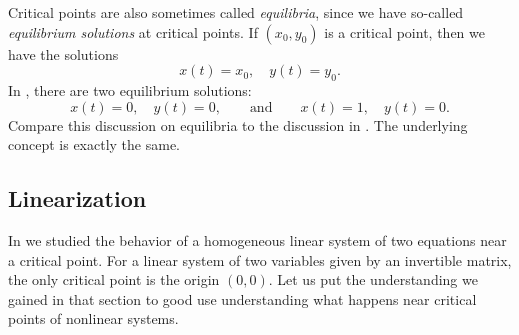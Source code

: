 Critical points are also sometimes called
\emph{equilibria}, since we have so-called
\emph{equilibrium solutions} at critical points.
If $(x_0,y_0)$ is a critical point, then we have the solutions
\begin{equation*}
x(t) = x_0, \quad y(t) = y_0 .
\end{equation*}
In , there are two equilibrium
solutions:
\begin{equation*}
x(t) = 0, \quad y(t) = 0,
\qquad \text{and} \qquad
x(t) = 1, \quad y(t) = 0.
\end{equation*}
Compare this discussion on equilibria to the discussion in
.  The underlying concept is
exactly the same.

\subsection{Linearization}

In  we studied the behavior of a homogeneous
linear system of two equations near a critical point.  For a linear system
of two variables given by an invertible matrix, the only critical point is
the origin $(0,0)$.
Let us put the understanding we gained in that section to good use
understanding what happens near critical points of nonlinear systems.

